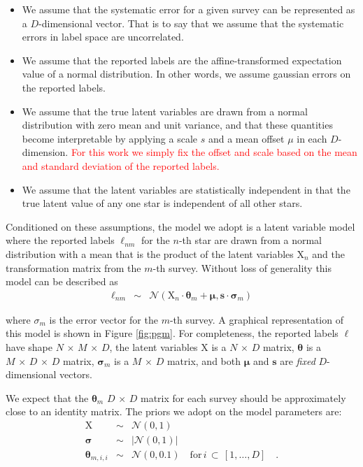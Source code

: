\documentclass[twocolumn]{aastex61}
\newcommand\labels{\mathcal{\ell}}
\newcommand\latents{\mathrm{X}}
\newcommand{\Dvector}[1]{\boldsymbol{#1}}
\newcommand{\veclabels}{\Dvector{\labels}}
\newcommand{\veclatents}{\Dvector{\latents}}
\newcommand{\vectheta}{\Dvector{\theta}}
\newcommand{\vecmu}{\Dvector{\mu}}
\newcommand{\vecsigma}{\Dvector{\sigma}}
\newcommand{\scale}{s}
\newcommand{\vecscale}{\Dvector{\scale}}
\newcommand{\todo}[1]{\textcolor{red}{#1}}
\begin{document}
\begin{itemize}
  \item We assume that the systematic error for a given survey can be represented
        as a $D$-dimensional vector. That is to say that we assume that the systematic
        errors in label space are uncorrelated.
  \item We assume that the reported labels are the affine-transformed expectation 
  		value of a normal distribution. In other words, we assume gaussian errors
		on the reported labels. 
  \item We assume that the true latent variables are drawn from a normal distribution
  		with zero mean and unit variance, and that these quantities become
		interpretable by applying a scale $\scale$ and a mean offset $\mu$ in each
		$D$-dimension. \todo{For this work we simply fix the offset and scale based
		on the mean and standard deviation of the reported labels.}
  \item We assume that the latent variables are statistically independent in that
	    the true latent value of any one star is independent of all other stars.
\end{itemize}

Conditioned on these assumptions, the model we adopt is a latent variable model
where the reported labels $\labels_{nm}$ for the $n$-th star are drawn from a normal
distribution with a mean that is the product of the latent variables $\textrm{X}_{n}$
and the transformation matrix from the $m$-th survey. Without loss of generality this
model can be described as
\begin{eqnarray}
	\veclabels_{nm} & \sim & \mathcal{N}\left(\veclatents_{n}\cdot\vectheta_{m} + \vecmu, \vecscale\cdot\vecsigma_{m} \right)  \label{eq:model}
\end{eqnarray}

\noindent{}where $\sigma_{m}$ is the error vector for the $m$-th survey. 
A graphical representation of this model is shown in Figure \ref{fig:pgm}.
For completeness, the reported labels 
	$\veclabels$ have shape $N\,\times\,M\,\times\,D$,
	the latent variables $\veclatents$ is a $N\,\times\,D$ matrix, 
	$\vectheta$ is a $M\,\times\,D\,\times\,D$ matrix,
	$\vecsigma_{m}$ is a $M\,\times\,D$ matrix, and 
	both $\vecmu$ and $\vecscale$ are \emph{fixed} $D$-dimensional vectors. 
	
We expect that the $\vectheta_{m}$ $D\,\times\,D$ matrix for each survey should be 
approximately close to an identity matrix. The priors we adopt on the model parameters are:
\begin{eqnarray}
	\veclatents       & \sim & \mathcal{N}\left(0, 1\right) \nonumber \\	
	\vecsigma 		  & \sim & |\mathcal{N}\left(0, 1\right)| \nonumber \\
	\vectheta_{m,i,i} & \sim & \mathcal{N}\left(0, 0.1\right) \quad \textrm{for}\,i\,\subset\,[1, \dots, D] \quad . \nonumber
\end{eqnarray}
\end{document}
